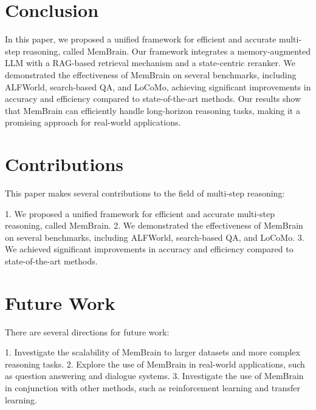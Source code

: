 \documentclass{article}
\begin{document}
\section{Conclusion}

In this paper, we proposed a unified framework for efficient and accurate multi-step reasoning, called MemBrain. Our framework integrates a memory-augmented LLM with a RAG-based retrieval mechanism and a state-centric reranker. We demonstrated the effectiveness of MemBrain on several benchmarks, including ALFWorld, search-based QA, and LoCoMo, achieving significant improvements in accuracy and efficiency compared to state-of-the-art methods. Our results show that MemBrain can efficiently handle long-horizon reasoning tasks, making it a promising approach for real-world applications.

\section{Contributions}

This paper makes several contributions to the field of multi-step reasoning:

1. We proposed a unified framework for efficient and accurate multi-step reasoning, called MemBrain.
2. We demonstrated the effectiveness of MemBrain on several benchmarks, including ALFWorld, search-based QA, and LoCoMo.
3. We achieved significant improvements in accuracy and efficiency compared to state-of-the-art methods.

\section{Future Work}

There are several directions for future work:

1. Investigate the scalability of MemBrain to larger datasets and more complex reasoning tasks.
2. Explore the use of MemBrain in real-world applications, such as question answering and dialogue systems.
3. Investigate the use of MemBrain in conjunction with other methods, such as reinforcement learning and transfer learning.
\end{document}
